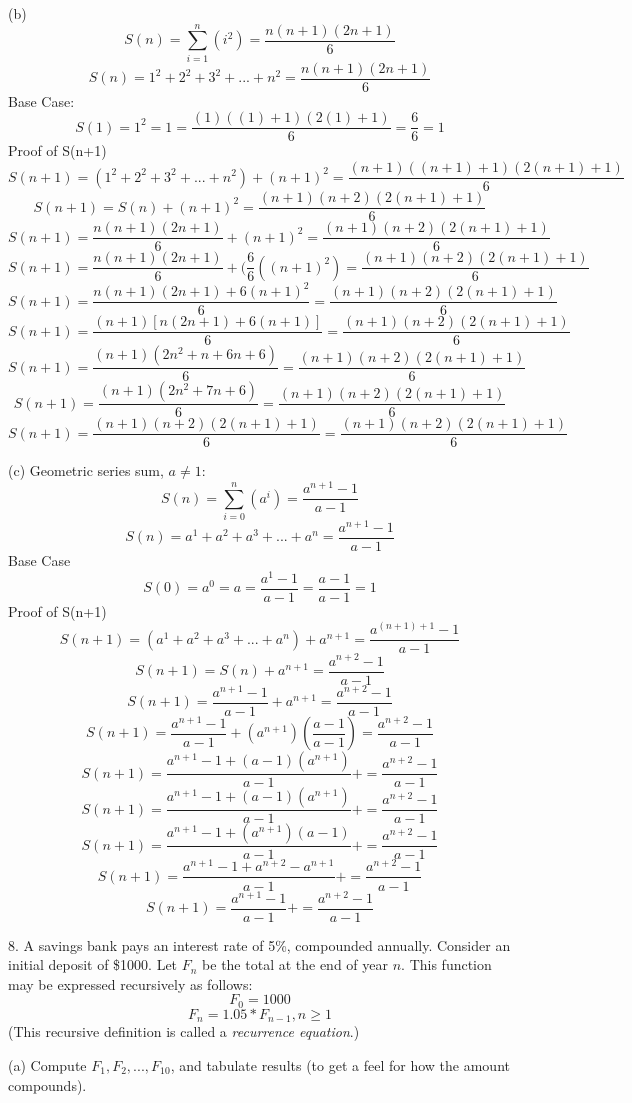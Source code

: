 \documentclass[10pt]{article}
\begin{document}
(b)
$$ S(n) = \sum\limits_{i=1}^n(i^2) = \frac{n(n + 1)(2n + 1)}{6}$$
$$ S(n) = 1^2 + 2^2 + 3^2 + ... + n^2 = \frac{n(n + 1)(2n + 1)}{6}$$
Base Case:
$$ S(1) = 1^2 = 1 = \frac{(1)((1) + 1)(2(1) + 1)}{6} = \frac{6}{6} = 1$$
Proof of S(n+1)
$$ S(n+1) = (1^2 + 2^2 + 3^2 + ... + n^2) + (n+1)^2 = \frac{(n+1)((n+1) + 1)(2(n+1) + 1)}{6}$$
$$ S(n+1) = S(n) + (n+1)^2 = \frac{(n+1)(n + 2)(2(n+1) + 1)}{6}$$
$$ S(n+1) = \frac{n(n + 1)(2n + 1)}{6} + (n+1)^2 = \frac{(n+1)(n + 2)(2(n+1) + 1)}{6}$$
$$ S(n+1) = \frac{n(n + 1)(2n + 1)}{6} + (\frac{6}{6}((n+1)^2) = \frac{(n+1)(n + 2)(2(n+1) + 1)}{6}$$
$$ S(n+1) = \frac{n(n + 1)(2n + 1)+6(n+1)^2}{6} = \frac{(n+1)(n + 2)(2(n+1) + 1)}{6}$$
$$ S(n+1) = \frac{(n + 1)[n(2n + 1)+6(n+1)]}{6} = \frac{(n+1)(n + 2)(2(n+1) + 1)}{6}$$
$$ S(n+1) = \frac{(n + 1)(2n^2 + n + 6n + 6)}{6} = \frac{(n+1)(n + 2)(2(n+1) + 1)}{6}$$
$$ S(n+1) = \frac{(n + 1)(2n^2 + 7n + 6)}{6} = \frac{(n+1)(n + 2)(2(n+1) + 1)}{6}$$
$$ S(n+1) = \frac{(n + 1)(n + 2)(2(n + 1) + 1)}{6} = \frac{(n+1)(n + 2)(2(n+1) + 1)}{6}$$

(c) Geometric series sum, $a \neq 1:$
$$ S(n) = \sum\limits_{i=0}^n(a^i) = \frac{a^{n+1} - 1}{a - 1}$$
$$ S(n) = a^1 + a^2 + a^3 + ... + a^n = \frac{a^{n+1} - 1}{a - 1}$$
Base Case
$$ S(0) = a^0 = a = \frac{a^{1} - 1}{a - 1} = \frac{a-1}{a-1} = 1$$
Proof of S(n+1)
$$ S(n+1) = (a^1 + a^2 + a^3 + ... + a^n) + a^{n+1} = \frac{a^{(n+1)+1} - 1}{a - 1}$$
$$ S(n+1) = S(n) + a^{n+1} = \frac{a^{n+2} - 1}{a - 1}$$
$$ S(n+1) = \frac{a^{n+1} - 1}{a - 1} + a^{n+1} = \frac{a^{n+2} - 1}{a - 1}$$
$$ S(n+1) = \frac{a^{n+1} - 1}{a - 1} + (a^{n+1})(\frac{a-1}{a-1}) = \frac{a^{n+2} - 1}{a - 1}$$
$$ S(n+1) = \frac{a^{n+1} - 1 + (a-1)(a^{n+1})}{a - 1} +  = \frac{a^{n+2} - 1}{a - 1}$$
$$ S(n+1) = \frac{a^{n+1} - 1 + (a-1)(a^{n+1})}{a - 1} +  = \frac{a^{n+2} - 1}{a - 1}$$
$$ S(n+1) = \frac{a^{n+1} - 1 +(a^{n+1})(a-1)}{a - 1} +  = \frac{a^{n+2} - 1}{a - 1}$$
$$ S(n+1) = \frac{a^{n+1} - 1 + a^{n+2} - a^{n+1}}{a - 1} +  = \frac{a^{n+2} - 1}{a - 1}$$
$$ S(n+1) = \frac{a^{n+1} - 1}{a - 1} +  = \frac{a^{n+2} - 1}{a - 1}$$

8. A savings bank pays an interest rate of 5\%, compounded annually.  Consider an initial deposit of \$1000. Let $F_n$ be the total at the end of year $n$.  This function may be expressed recursively as follows:
$$F_0 = 1000$$
$$F_n = 1.05 * F_{n-1}, n \geq 1$$
(This recursive definition is called a \textit{recurrence equation}.)

(a) Compute $F_1,F_2,...,F_{10}$, and tabulate results (to get a feel for how the amount compounds).
\end{document}
